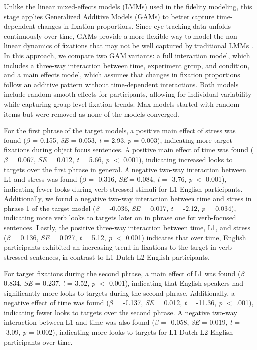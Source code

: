 Unlike the linear mixed-effects models (LMMs) used in the fidelity modeling, this stage applies Generalized Additive Models (GAMs) to better capture time-dependent changes in fixation proportions. Since eye-tracking data unfolds continuously over time, GAMs provide a more flexible way to model the non-linear dynamics of fixations that may not be well captured by traditional LMMs \citep{Wood2017}. In this approach, we compare two GAM variants: a full interaction model, which includes a three-way interaction between time, experiment group, and condition, and a main effects model, which assumes that changes in fixation proportions follow an additive pattern without time-dependent interactions. Both models include random smooth effects for participants, allowing for individual variability while capturing group-level fixation trends. Max models started with random items but were removed as none of the models converged.

For the first phrase of the target models, a positive main effect of stress was found ($\beta$ = 0.155, \textit{SE} = 0.053, \textit{t} = 2.93, \textit{p} = 0.003), indicating more target fixations during object focus sentences. A positive main effect of time was found ($\beta$ = 0.067, \textit{SE} = 0.012, \textit{t} = 5.66, \textit{p} $<$ 0.001), indicating increased looks to targets over the first phrase in general. A negative two-way interaction between L1 and stress was found ($\beta$ = -0.316, \textit{SE} = 0.084, \textit{t} = -3.76, \textit{p} $<$ 0.001), indicating fewer looks during verb stressed stimuli for L1 English participants. Additionally, we found a negative two-way interaction between time and stress in phrase 1 of the target model ($\beta$ = -0.036, \textit{SE} = 0.017, \textit{t} = -2.12, \textit{p} = 0.034), indicating more verb looks to targets later on in phrase one for verb-focused sentences. Lastly, the positive three-way interaction between time, L1, and stress ($\beta$ = 0.136, \textit{SE} = 0.027, \textit{t} = 5.12, \textit{p} $<$ 0.001) indicates that over time, English participants exhibited an increasing trend in fixations to the target in verb-stressed sentences, in contrast to L1 Dutch-L2 English participants.
 
 For target fixations during the second phrase, a main effect of L1 was found ($\beta$ = 0.834, \textit{SE} = 0.237, \textit{t} = 3.52, \textit{p} $<$ 0.001), indicating that English speakers had significantly more looks to targets during the second phrase. Additionally, a negative effect of time was found ($\beta$ = -0.137, \textit{SE} = 0.012, \textit{t} = -11.36, \textit{p} $<$ .001), indicating fewer looks to targets over the second phrase. A negative two-way interaction between L1 and time was also found ($\beta$ = -0.058, \textit{SE} = 0.019, \textit{t} = -3.09, \textit{p} = 0.002), indicating more looks to targets for L1 Dutch-L2 English participants over time.

